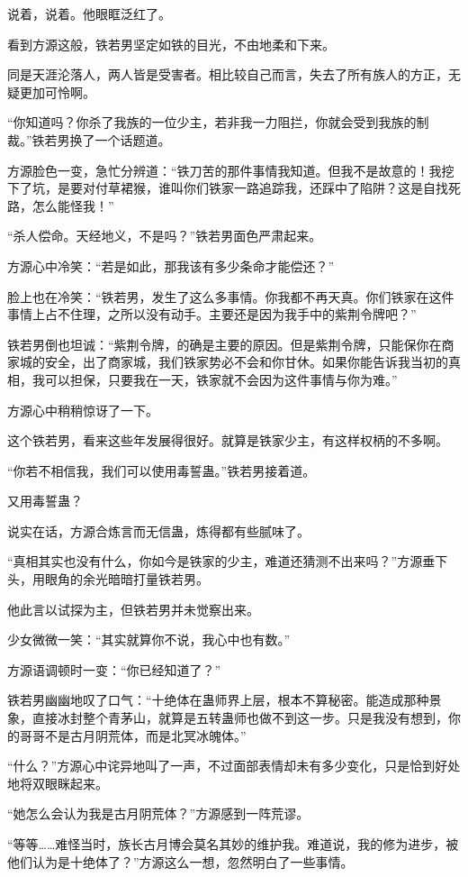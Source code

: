 \begin{this_body}
说着，说着。他眼眶泛红了。

看到方源这般，铁若男坚定如铁的目光，不由地柔和下来。

同是天涯沦落人，两人皆是受害者。相比较自己而言，失去了所有族人的方正，无疑更加可怜啊。

“你知道吗？你杀了我族的一位少主，若非我一力阻拦，你就会受到我族的制裁。”铁若男换了一个话题道。

方源脸色一变，急忙分辨道：“铁刀苦的那件事情我知道。但我不是故意的！我挖下了坑，是要对付草裙猴，谁叫你们铁家一路追踪我，还踩中了陷阱？这是自找死路，怎么能怪我！”

“杀人偿命。天经地义，不是吗？”铁若男面色严肃起来。

方源心中冷笑：“若是如此，那我该有多少条命才能偿还？”

脸上也在冷笑：“铁若男，发生了这么多事情。你我都不再天真。你们铁家在这件事情上占不住理，之所以没有动手。主要还是因为我手中的紫荆令牌吧？”

铁若男倒也坦诚：“紫荆令牌，的确是主要的原因。但是紫荆令牌，只能保你在商家城的安全，出了商家城，我们铁家势必不会和你甘休。如果你能告诉我当初的真相，我可以担保，只要我在一天，铁家就不会因为这件事情与你为难。”

方源心中稍稍惊讶了一下。

这个铁若男，看来这些年发展得很好。就算是铁家少主，有这样权柄的不多啊。

“你若不相信我，我们可以使用毒誓蛊。”铁若男接着道。

又用毒誓蛊？

说实在话，方源合炼言而无信蛊，炼得都有些腻味了。

“真相其实也没有什么，你如今是铁家的少主，难道还猜测不出来吗？”方源垂下头，用眼角的余光暗暗打量铁若男。

他此言以试探为主，但铁若男并未觉察出来。

少女微微一笑：“其实就算你不说，我心中也有数。”

方源语调顿时一变：“你已经知道了？”

铁若男幽幽地叹了口气：“十绝体在蛊师界上层，根本不算秘密。能造成那种景象，直接冰封整个青茅山，就算是五转蛊师也做不到这一步。只是我没有想到，你的哥哥不是古月阴荒体，而是北冥冰魄体。”

“什么？”方源心中诧异地叫了一声，不过面部表情却未有多少变化，只是恰到好处地将双眼眯起来。

“她怎么会认为我是古月阴荒体？”方源感到一阵荒谬。

“等等……难怪当时，族长古月博会莫名其妙的维护我。难道说，我的修为进步，被他们认为是十绝体了？”方源这么一想，忽然明白了一些事情。


\end{this_body}
